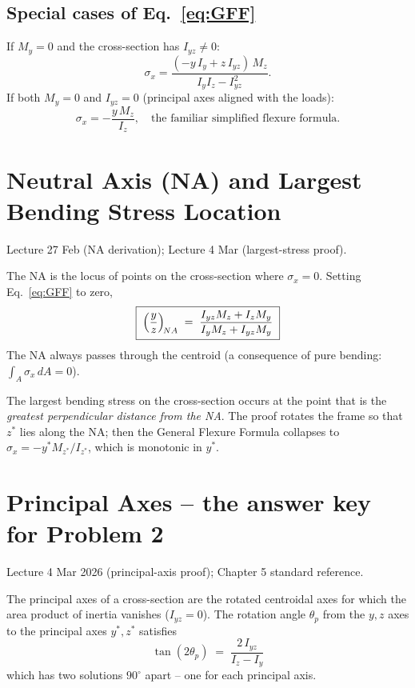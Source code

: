 \documentclass[11pt]{article}
\begin{document}
\subsection*{Special cases of Eq.~\eqref{eq:GFF}}

If $M_y = 0$ and the cross-section has $I_{yz} \neq 0$:
$$\sigma_x = \frac{(-y\,I_y + z\,I_{yz})\, M_z}{I_y I_z - I_{yz}^2}.$$
If both $M_y = 0$ and $I_{yz} = 0$ (principal axes aligned with the loads):
$$\sigma_x = -\frac{y\, M_z}{I_z}, \quad \text{the familiar simplified flexure formula.}$$

\section{Neutral Axis (NA) and Largest Bending Stress Location}

\begin{citebox}{Lecture 27 Feb (NA derivation); Lecture 4 Mar (largest-stress proof).}
\end{citebox}

The NA is the locus of points on the cross-section where $\sigma_x = 0$. Setting Eq.~\eqref{eq:GFF} to zero,
\begin{equation}
\boxed{\;\Bigl(\dfrac{y}{z}\Bigr)_{\!NA} \;=\; \dfrac{I_{yz} M_z + I_z M_y}{I_y M_z + I_{yz} M_y}\;}\label{eq:NA}
\end{equation}
The NA always passes through the centroid (a consequence of pure bending: $\int_A \sigma_x \, dA = 0$).

The largest bending stress on the cross-section occurs at the point that is the \emph{greatest perpendicular distance from the NA}. The proof rotates the frame so that $z^*$ lies along the NA; then the General Flexure Formula collapses to $\sigma_x = -y^* M_{z^*} / I_{z^*}$, which is monotonic in $y^*$.

\section{Principal Axes -- the answer key for Problem 2}

\begin{citebox}{Lecture 4 Mar 2026 (principal-axis proof); Chapter 5 standard reference.}
\end{citebox}

The principal axes of a cross-section are the rotated centroidal axes for which the area product of inertia vanishes ($I_{yz} = 0$). The rotation angle $\theta_p$ from the $y, z$ axes to the principal axes $y^\ast, z^\ast$ satisfies
\begin{equation}
\boxed{\;\tan(2\theta_p) \;=\; \dfrac{2\,I_{yz}}{I_z - I_y}\;}\label{eq:princ}
\end{equation}
which has two solutions $90^\circ$ apart -- one for each principal axis.
\end{document}
